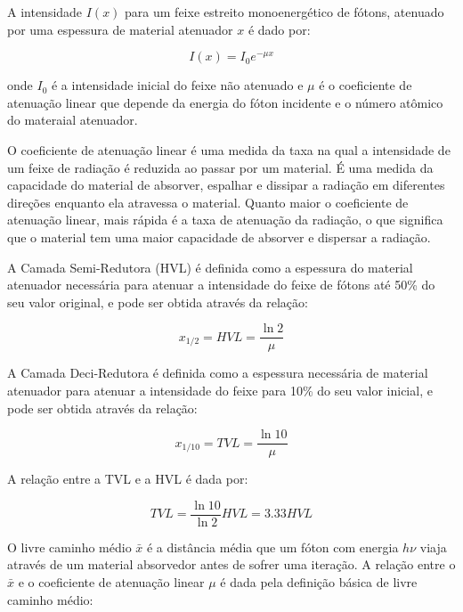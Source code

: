 \documentclass[11pt,a4paper]{article}
\begin{document}
    A intensidade $I(x)$ para um feixe estreito monoenergético de fótons, atenuado por uma espessura de material atenuador $x$ é dado por:

                \begin{equation}
                    I(x) = I_0 e^{-\mu x}
                \end{equation}
            
    \noindent onde $I_0$ é a intensidade inicial do feixe não atenuado e $\mu$ é o coeficiente de atenuação linear que depende da energia do fóton incidente e o número atômico do materaial atenuador.

    O coeficiente de atenuação linear é uma medida da taxa na qual a intensidade de um feixe de radiação é reduzida ao passar por um material. É uma medida da capacidade do material de absorver, espalhar e dissipar a radiação em diferentes direções enquanto ela atravessa o material. Quanto maior o coeficiente de atenuação linear, mais rápida é a taxa de atenuação da radiação, o que significa que o material tem uma maior capacidade de absorver e dispersar a radiação.

    A Camada Semi-Redutora (HVL) é definida como a espessura do material atenuador necessária para atenuar a intensidade do feixe de fótons até 50\% do seu valor original, e pode ser obtida através da relação:

                \begin{equation}
                    x_{1/2} = HVL = \frac{\ln 2}{\mu}
                \end{equation}
            

    A Camada Deci-Redutora é definida como a espessura necessária de material atenuador para atenuar a intensidade do feixe para 10\% do seu valor inicial, e pode ser obtida através da relação:

                \begin{equation}
                    x_{1/10} = TVL = \frac{\ln 10}{\mu}
                \end{equation}

            A relação entre a TVL e a HVL é dada por:

            \begin{equation}
                TVL = \frac{\ln 10}{ \ln 2} HVL = 3.33 HVL
            \end{equation}

    O livre caminho médio $\bar{x}$ é a distância média que um fóton com energia $h \nu$ viaja através de um material absorvedor antes de sofrer uma iteração.  A relação entre o $\bar{x}$ e o coeficiente de atenuação linear $\mu$ é dada pela definição básica de livre caminho médio:
\end{document}
